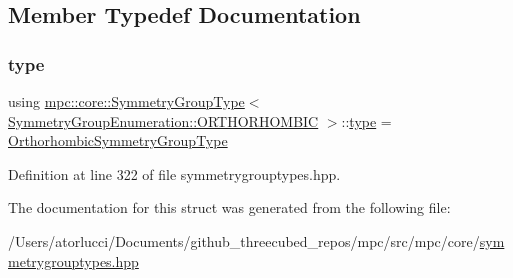 \subsection{Member Typedef Documentation}
\mbox{\label{structmpc_1_1core_1_1_symmetry_group_type_3_01_symmetry_group_enumeration_1_1_o_r_t_h_o_r_h_o_m_b_i_c_01_4_aa03457fea042819a7f1a790049474067}} 
\subsubsection{\texorpdfstring{type}{type}}
{\footnotesize\ttfamily using \mbox{\hyperlink{structmpc_1_1core_1_1_symmetry_group_type}{mpc\+::core\+::\+Symmetry\+Group\+Type}}$<$ \mbox{\hyperlink{namespacempc_1_1core_a9d979684062547055a0ef5c13077bad8a45ddba8b47424b406a313caed88b091a}{Symmetry\+Group\+Enumeration\+::\+O\+R\+T\+H\+O\+R\+H\+O\+M\+B\+IC}} $>$\+::\mbox{\hyperlink{structmpc_1_1core_1_1_symmetry_group_type_3_01_symmetry_group_enumeration_1_1_o_r_t_h_o_r_h_o_m_b_i_c_01_4_aa03457fea042819a7f1a790049474067}{type}} =  \mbox{\hyperlink{structmpc_1_1core_1_1_orthorhombic_symmetry_group_type}{Orthorhombic\+Symmetry\+Group\+Type}}}



Definition at line 322 of file symmetrygrouptypes.\+hpp.



The documentation for this struct was generated from the following file\+:\begin{DoxyCompactItemize}
\item 
/\+Users/atorlucci/\+Documents/github\+\_\+threecubed\+\_\+repos/mpc/src/mpc/core/\mbox{\hyperlink{symmetrygrouptypes_8hpp}{symmetrygrouptypes.\+hpp}}\end{DoxyCompactItemize}

